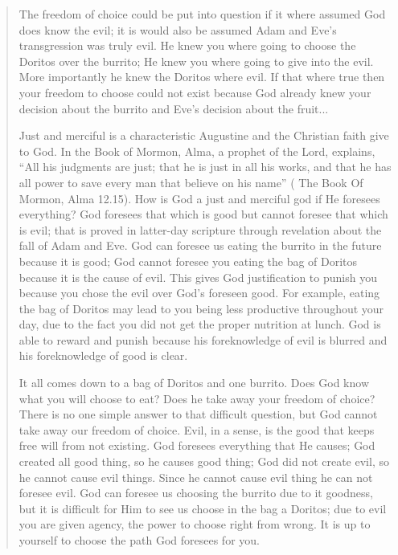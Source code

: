 \begin{quote}
				The freedom of choice could be put into question if it where assumed God does know the evil; it is would also be assumed Adam and Eve’s transgression was truly evil. He knew you where going to choose the Doritos over the burrito; He knew you where going to give into the evil. More importantly he knew the Doritos where evil. If that where true then your freedom to choose could not exist because God already knew your decision about the burrito and Eve’s decision about the fruit...

				Just and merciful is a characteristic Augustine and the Christian faith give to God. In the Book of Mormon, Alma, a prophet of the Lord, explains, ``All his judgments are just; that he is just in all his works, and that he has all power to save every man that believe on his name'' ( The Book Of Mormon, Alma 12.15). How is God a just and merciful god if He foresees everything? God foresees that which is good but cannot foresee that which is evil; that is proved in latter-day scripture through revelation about the fall of Adam and Eve. God can foresee us eating the burrito in the future because it is good; God cannot foresee you eating the bag of Doritos because it is the cause of evil. This gives God justification to punish you because you chose the evil over God’s foreseen good. For example, eating the bag of Doritos may lead to you being less productive throughout your day, due to the fact you did not get the proper nutrition at lunch. God is able to reward and punish because his foreknowledge of evil is blurred and his foreknowledge of good is clear. 

				It all comes down to a bag of Doritos and one burrito. Does God know what you will choose to eat? Does he take away your freedom of choice? There is no one simple answer to that difficult question, but God cannot take away our freedom of choice. Evil, in a sense, is the good that keeps free will from not existing. God foresees everything that He causes; God created all good thing, so he causes good thing; God did not create evil, so he cannot cause evil things. Since he cannot cause evil thing he can not foresee evil. God can foresee us choosing the burrito due to it goodness, but it is difficult for Him to see us choose in the bag a Doritos; due to evil you are given agency, the power to choose right from wrong. It is up to yourself to choose the path God foresees for you.
			\end{quote}